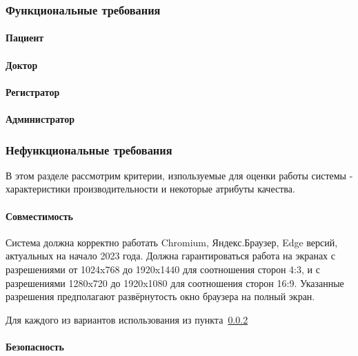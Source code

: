 \documentclass[a4paper,article]{article}
\begin{document}
    \subsubsection{Функциональные требования}\label{ТЗ. Функциональные требования}

    \paragraph{Пациент}\label{ТЗ. Пациент}

    \paragraph{Доктор}\label{ТЗ. Доктор}

    \paragraph{Регистратор}\label{ТЗ. Регистратор}

    \paragraph{Администратор}\label{ТЗ. Администратор}

    \newpage

    \subsubsection{Нефункциональные требования}

    В этом разделе рассмотрим критерии, изпользуемые для оценки работы системы - характеристики производительности и некоторые атрибуты качества.

    \paragraph{Совместимость}\label{ТЗ. Интерфейс пользователя}

    Система должна корректно работать Chromium, Яндекс.Браузер, Edge версий, актуальных на начало 2023 года. Должна гарантироваться работа на экранах с разрешениями от 1024x768 до 1920x1440 для соотношения сторон 4:3, и с разрешениями 1280x720 до 1920x1080 для соотношения сторон 16:9. Указанные разрешения предполагают развёрнутость окно браузера на полный экран.

    Для каждого из вариантов использования из пункта~\ref{}

    \paragraph{Безопасность}\label{ТЗ. Безопасность}
\end{document}
